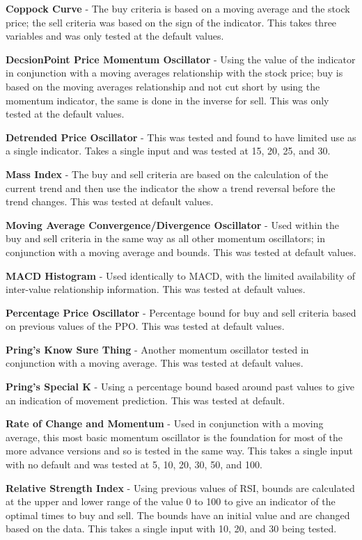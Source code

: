 \documentclass[conference]{IEEEtran}
\begin{document}
\textbf{Coppock Curve} - The buy criteria is based on a moving average and the stock price; the sell criteria was based on the sign of the indicator. This takes three variables and was only tested at the default values.

\textbf{DecsionPoint Price Momentum Oscillator} - Using the value of the indicator in conjunction with a moving averages relationship with the stock price; buy is based on the moving averages relationship and not cut short by using the momentum indicator, the same is done in the inverse for sell. This was only tested at the default values.

\textbf{Detrended Price Oscillator} - This was tested and found to have limited use as a single indicator. Takes a single input and was tested at 15, 20, 25, and 30.

\textbf{Mass Index} - The buy and sell criteria are based on the calculation of the current trend and then use the indicator the show a trend reversal before the trend changes. This was tested at default values.

\textbf{Moving Average Convergence/Divergence Oscillator} - Used within the buy and sell criteria in the same way as all other momentum oscillators; in conjunction with a moving average and bounds. This was tested at default values.

\textbf{MACD Histogram} - Used identically to MACD, with the limited availability of inter-value relationship information. This was tested at default values. 

\textbf{Percentage Price Oscillator} - Percentage bound for buy and sell criteria based on previous values of the PPO. This was tested at default values.

\textbf{Pring's Know Sure Thing} - Another momentum oscillator tested in conjunction with a moving average. This was tested at default values.

\textbf{Pring's Special K} - Using a percentage bound based around past values to give an indication of movement prediction. This was tested at default. 

\textbf{Rate of Change and Momentum} - Used in conjunction with a moving average, this most basic momentum oscillator is the foundation for most of the more advance versions and so is tested in the same way. This takes a single input with no default and was tested at 5, 10, 20, 30, 50, and 100.

\textbf{Relative Strength Index} - Using previous values of RSI, bounds are calculated at the upper and lower range of the value 0 to 100 to give an indicator of the optimal times to buy and sell. The bounds have an initial value and are changed based on the data. This takes a single input with 10, 20, and 30 being tested.
\end{document}
